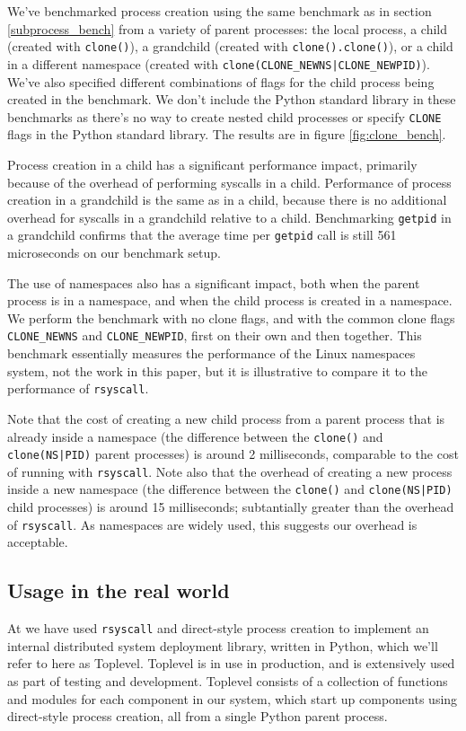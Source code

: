 \documentclass[letterpaper,twocolumn,10pt]{article}
\begin{document}
We've benchmarked process creation using the same benchmark as in section \ref{subprocess_bench}
from a variety of parent processes: the local process,
a child (created with \texttt{clone()}),
a grandchild (created with \texttt{clone().clone()}),
or a child in a different namespace (created with \verb=clone(CLONE_NEWNS|CLONE_NEWPID)=).
We've also specified different combinations of flags for the child process being created in the benchmark.
We don't include the Python standard library in these benchmarks
as there's no way to create nested child processes or specify \texttt{CLONE} flags in the Python standard library.
The results are in figure \ref{fig:clone_bench}.

Process creation in a child has a significant performance impact,
primarily because of the overhead of performing syscalls in a child.
Performance of process creation in a grandchild is the same as in a child,
because there is no additional overhead for syscalls in a grandchild relative to a child.
Benchmarking \texttt{getpid} in a grandchild
confirms that the average time per \texttt{getpid} call is still 561 microseconds on our benchmark setup.

The use of namespaces also has a significant impact,
both when the parent process is in a namespace, and when the child process is created in a namespace.
We perform the benchmark with no clone flags, and with the common clone flags
\verb|CLONE_NEWNS| and \verb|CLONE_NEWPID|, first on their own and then together.
This benchmark essentially measures the performance of the Linux namespaces system, not the work in this paper,
but it is illustrative to compare it to the performance of \texttt{rsyscall}.

Note that the cost of creating a new child process from a parent process that is already inside a namespace
(the difference between the \texttt{clone()} and \texttt{clone(NS|PID)} parent processes)
is around 2 milliseconds, comparable to the cost of running with \texttt{rsyscall}.
Note also that the overhead of creating a new process inside a new namespace
(the difference between the \texttt{clone()} and \texttt{clone(NS|PID)} child processes)
is around 15 milliseconds; subtantially greater than the overhead of \texttt{rsyscall}.
As namespaces are widely used,
this suggests our overhead is acceptable.
\subsection{Usage in the real world}\label{realworld}
At \twosigma{} we have used \texttt{rsyscall} and direct-style process creation
to implement an internal distributed system deployment library, written in Python,
which we'll refer to here as Toplevel.
Toplevel is in use in production,
and is extensively used as part of testing and development.
Toplevel consists of a collection of functions and modules
for each component in our system,
which start up components using direct-style process creation,
all from a single Python parent process.
\end{document}
